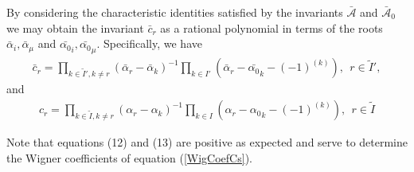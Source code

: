 \documentclass[12pt]{article}
\begin{document}
By considering the characteristic identities satisfied by the invariants $\bar{\mathcal{A}}$ and $\bar{\mathcal{A}}_0$ we may obtain the invariant $\bar{c}_r$ as a rational polynomial in terms of the roots $\bar{\alpha}_i,\bar{\alpha}_\mu$ and $\bar{\alpha_0}_i,\bar{\alpha_0}_\mu$. Specifically, we have \cite{GIW1}
\begin{align}
\bar{c}_r = \prod_{k\in \tilde{I}',k\neq r} \left(\bar{\alpha}_r - \bar{\alpha}_k\right)^{-1}\prod_{k\in
I'} \left(\bar{\alpha}_r - \bar{\alpha_0}_k - (-1)^{(k)}\right),\ \ r\in \tilde{I}',
\end{align}
and
\begin{align}
c_r = \prod_{k\in \tilde{I},k\neq r} \left(\alpha_r - \alpha_k \right)^{-1}\prod_{k\in
I} \left(\alpha_r - {\alpha_0}_k - (-1)^{(k)}\right),\ \ r\in \tilde{I}
\end{align}

Note that equations (12) and (13) are positive as expected and serve to determine the Wigner coefficients of equation (\ref{WigCoefCs}).
\end{document}
